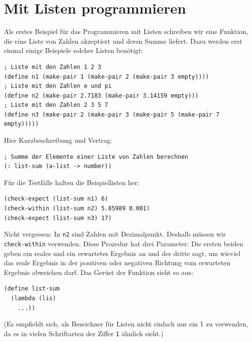 \section{Mit Listen programmieren}

Als erstes Beispiel für das Programmieren mit Listen schreiben wir
eine Funktion, die eine Liste von Zahlen akzeptiert und deren Summe
liefert.  Dazu werden erst einmal einige Beispiele solcher Listen
benötigt:
%
\begin{verbatim}
; Liste mit den Zahlen 1 2 3
(define n1 (make-pair 1 (make-pair 2 (make-pair 3 empty))))
; Liste mit den Zahlen e und pi
(define n2 (make-pair 2.7183 (make-pair 3.14159 empty)))
; Liste mit den Zahlen 2 3 5 7
(define n3 (make-pair 2 (make-pair 3 (make-pair 5 (make-pair 7 empty)))))
\end{verbatim}

Hier Kurzbeschreibung und Vertrag:\label{sec:list-sum}
%
\begin{verbatim}
; Summe der Elemente einer Liste von Zahlen berechnen
(: list-sum (a-list -> number))
\end{verbatim}
%
Für die Testfälle halten die Beispiellisten her:
%
\begin{verbatim}
(check-expect (list-sum n1) 6)
(check-within (list-sum n2) 5.85989 0.001)
(check-expect (list-sum n3) 17)
\end{verbatim}
%
Nicht vergessen: In \texttt{n2} sind Zahlen mit Dezimalpunkt.
Deshalb müssen wir \texttt{check-within} verwenden.  Diese Prozedur
hat drei Parameter: Die ersten beiden geben ein reales und ein
erwartetes Ergebnis an
und der dritte sagt, um wieviel das reale Ergebnis in der positiven
oder negativen Richtung vom erwarteten Ergebnis abweichen darf. Das Gerüst der
Funktion sieht so aus:
%
\begin{verbatim}
(define list-sum
  (lambda (lis)
    ...))
\end{verbatim}
%
(Es empfiehlt sich, als Bezeichner für Listen nicht einfach nur ein
\texttt{l} zu verwenden, da es in vielen Schriftarten der Ziffer
\texttt{1} ähnlich sieht.)

